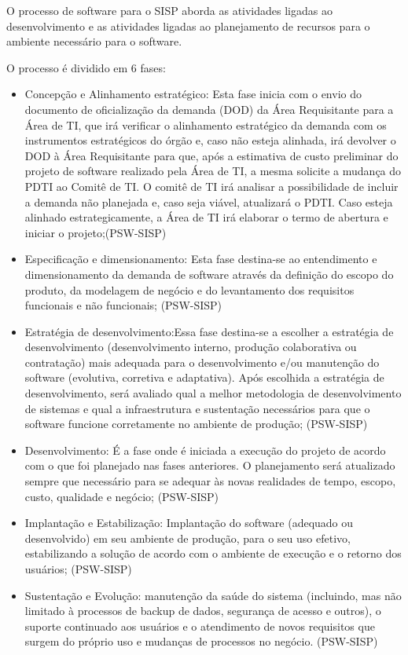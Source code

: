 O processo de software para o SISP aborda as atividades ligadas ao desenvolvimento 
e as atividades ligadas ao planejamento de recursos para o ambiente necessário para
o software.

O processo é dividido em 6 fases:

\begin{itemize}
\item Concepção e Alinhamento estratégico: Esta fase inicia com o envio do 
documento de oficialização da demanda (DOD) da Área Requisitante para a Área de 
TI, que irá verificar o alinhamento estratégico da demanda com os instrumentos 
estratégicos do órgão e, caso não esteja alinhada, irá devolver o DOD à Área 
Requisitante para que, após a estimativa de custo preliminar do projeto de software 
realizado pela Área de TI, a mesma solicite a mudança do PDTI ao Comitê de TI. O 
comitê de TI irá analisar a possibilidade de incluir a demanda não planejada e, 
caso seja viável, atualizará o PDTI. Caso esteja alinhado estrategicamente, a 
Área de TI irá elaborar o termo de abertura e iniciar o projeto;(PSW-SISP)

\item Especificação e dimensionamento: Esta fase destina-se ao entendimento e 
dimensionamento da demanda de software através da definição do escopo do produto, 
da modelagem de negócio e do levantamento dos requisitos funcionais e não funcionais;
(PSW-SISP)

\item Estratégia de desenvolvimento:Essa fase destina-se a escolher a estratégia 
de desenvolvimento (desenvolvimento interno, produção colaborativa ou contratação) 
mais adequada para o desenvolvimento e/ou manutenção do software (evolutiva, 
corretiva e adaptativa). Após escolhida a estratégia de desenvolvimento, será 
avaliado qual a melhor metodologia de desenvolvimento de sistemas e qual a infraestrutura 
e sustentação necessários para que o software funcione corretamente no ambiente de produção; 
(PSW-SISP)

\item Desenvolvimento: É a fase onde é iniciada a execução do projeto de acordo 
com o que foi planejado nas fases anteriores. O planejamento será atualizado 
sempre que necessário para se adequar às novas realidades de tempo, escopo, 
custo, qualidade e negócio; (PSW-SISP)

\item Implantação e Estabilização: Implantação do software (adequado ou desenvolvido) 
em seu ambiente de produção, para o seu uso efetivo, estabilizando a solução de 
acordo com o ambiente de execução e o retorno dos usuários; (PSW-SISP)

\item Sustentação e Evolução: manutenção da saúde do sistema (incluindo, mas não 
limitado à processos de backup de dados, segurança de acesso e outros), o suporte 
continuado aos usuários e o atendimento de novos requisitos que surgem do próprio 
uso e mudanças de processos no negócio. (PSW-SISP)

\end{itemize}

